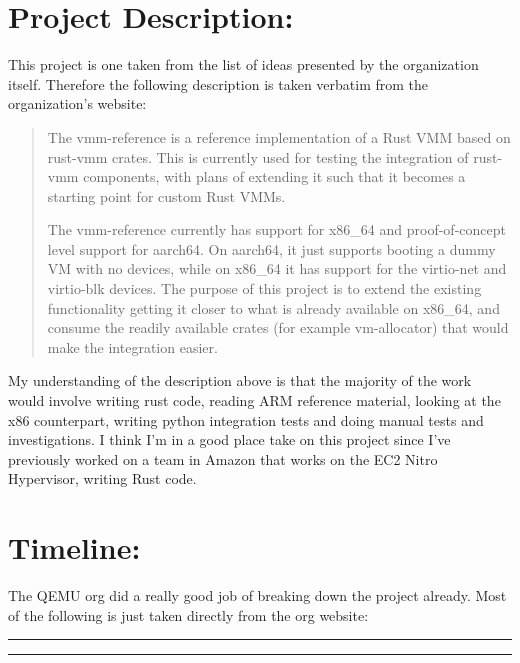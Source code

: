 \begin{normalsize}

\section{Project Description:}

This project is one taken from the list of ideas presented by the organization
itself. Therefore the following description is taken verbatim from the
organization's website:

\begin{quote}

The vmm-reference is a reference implementation of a Rust VMM based on rust-vmm
crates. This is currently used for testing the integration of rust-vmm components,
with plans of extending it such that it becomes a starting point for custom Rust
VMMs.

The vmm-reference currently has support for x86\_64 and proof-of-concept level
support for aarch64. On aarch64, it just supports booting a dummy VM with no
devices, while on x86\_64 it has support for the virtio-net and virtio-blk devices.
The purpose of this project is to extend the existing functionality getting it
closer to what is already available on x86\_64, and consume the readily available
crates (for example vm-allocator) that would make the integration easier.

\end{quote}

My understanding of the description above is that the majority of the work would
involve writing rust code, reading ARM reference material, looking at the x86
counterpart, writing python integration tests and doing manual tests and
investigations. I think I'm in a good place take on this project since I've
previously worked on a team in Amazon that works on the EC2 Nitro Hypervisor,
writing Rust code.

\section{Timeline:}

The QEMU org did a really good job of breaking down the project already. Most of
the following is just taken directly from the org website:

\begin{table}[H]
\centering
\begin{minipage}[t]{.7\linewidth}
\rule{\linewidth}{1pt}
\bigskip
\rule{\linewidth}{1pt}%
\end{minipage}%
\end{table}


\end{normalsize}

